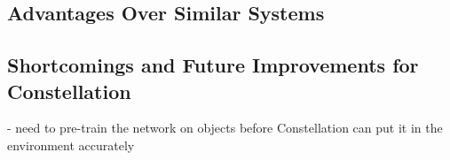 \subsection{Advantages Over Similar Systems}
\subsection{Shortcomings and Future Improvements for Constellation}
- need to pre-train the network on objects before Constellation can put it in the environment accurately
